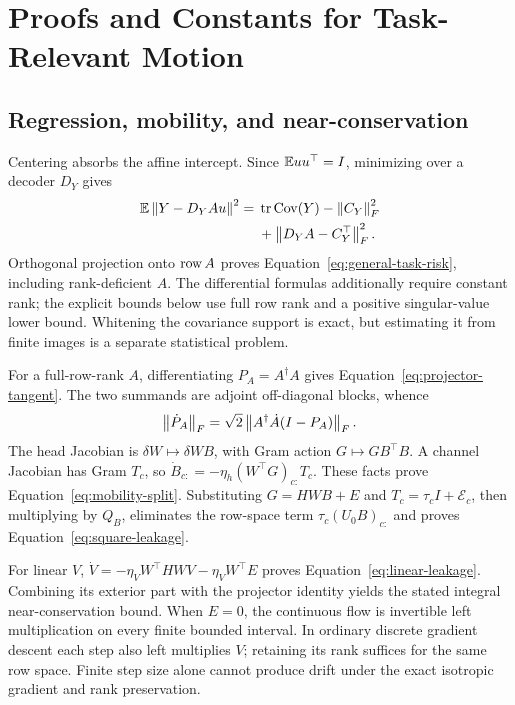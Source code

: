 \section{Proofs and Constants for Task-Relevant Motion}
\label{app:task-geometry}
\label{supp:core-proofs}
\subsection{Regression, mobility, and near-conservation}
Centering absorbs the affine intercept. Since $\mathbb E uu^\top=I$, minimizing over a decoder $D_Y$ gives
\begin{align}
 \mathbb E\left\lVert Y-D_YAu\right\rVert^2={}&\operatorname{tr}\operatorname{Cov}(Y)-\left\lVert C_Y\right\rVert_F^2\\
 &+\left\lVert D_YA-C_Y^\top\right\rVert_F^2.\nonumber
\end{align}
Orthogonal projection onto $\operatorname{row} A$ proves Equation~\eqref{eq:general-task-risk}, including rank-deficient $A$. The differential formulas additionally require constant rank; the explicit bounds below use full row rank and a positive singular-value lower bound. Whitening the covariance support is exact, but estimating it from finite images is a separate statistical problem.

For a full-row-rank $A$, differentiating $P_A=A^\dagger A$ gives Equation~\eqref{eq:projector-tangent}. The two summands are adjoint off-diagonal blocks, whence
\begin{equation}
 \left\lVert \dot P_A\right\rVert_F=\sqrt2\left\lVert A^\dagger\dot A(I-P_A)\right\rVert_F.
\end{equation}
The head Jacobian is $\delta W\mapsto\delta WB$, with Gram action $G\mapsto GB^\top B$. A channel Jacobian has Gram $T_c$, so $\dot B_{c:}=-\eta_h(W^\top G)_{c:}T_c$. These facts prove Equation~\eqref{eq:mobility-split}. Substituting $G=HWB+E$ and $T_c=\tau_cI+\mathcal E_c$, then multiplying by $Q_B$, eliminates the row-space term $\tau_c(U_0B)_{c:}$ and proves Equation~\eqref{eq:square-leakage}.

For linear $V$, $\dot V=-\eta_VW^\top HWV-\eta_VW^\top E$ proves Equation~\eqref{eq:linear-leakage}. Combining its exterior part with the projector identity yields the stated integral near-conservation bound. When $E=0$, the continuous flow is invertible left multiplication on every finite bounded interval. In ordinary discrete gradient descent each step also left multiplies $V$; retaining its rank suffices for the same row space. Finite step size alone cannot produce drift under the exact isotropic gradient and rank preservation.

